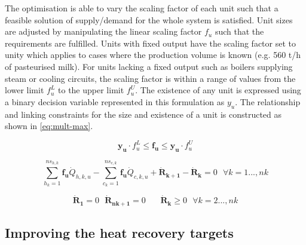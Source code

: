 The optimisation is able to vary the scaling factor of each unit such that a feasible solution of supply/demand for the whole system is satisfied. Unit sizes are adjusted by manipulating the linear scaling factor $f_u$ such that the requirements are fulfilled. Units with fixed output have the scaling factor set to unity which applies to cases where the production volume is known (e.g. 560 t/h of pasteurised milk). For units lacking a fixed output such as boilers supplying steam or cooling circuits, the scaling factor is within a range of values from the lower limit $f_{u}^{L}$ to the upper limit $f_{u}^{U}$. The existence of any unit is expressed using a binary decision variable represented in this formulation as $y_u$. The relationship and linking constraints for the size and existence of a unit is constructed as shown in \ref{eq:mult-max}.

\begin{equation}
\label{eq:mult-max}
\boldsymbol {y_{u}} \cdot f_{u}^L \leq \boldsymbol {f_u} \leq \boldsymbol {y_u} \cdot f_u^U
\end{equation}

\begin{equation}
 \label{eq:heat-cascade}
\sum_{h_k=1}^{ns_{h,k}}{\boldsymbol {f_u} \dot{Q}_{h,k,u}} - \sum_{c_k=1}^{ns_{c,k}}{\boldsymbol {f_u} \dot{Q}_{c,k,u} } +\boldsymbol {\dot{R}_{k+1}}  -\boldsymbol {\dot{R}_{k}}   = 0
~~~\forall k=1...,nk
\end{equation}



\begin{equation}
\label{eq:Rk-constraints}
\boldsymbol {\dot{R}_{1}} = 0 ~~~ \boldsymbol {\dot{R}_{nk+1}}=0 ~~~~~~~~ \boldsymbol {\dot{R}_{k}} \geq 0 ~~~\forall k=2...,nk
\end{equation}

\subsection{Improving the heat recovery targets}
\label{sec:TSIheatrecovery}

